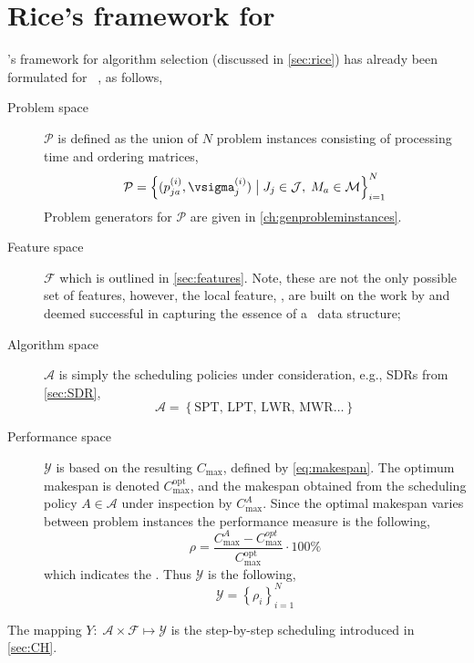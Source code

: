 \section{Rice's framework for \jsp}\label{sec:rice:jsp}
\citeauthor{Rice76}'s framework for algorithm selection (discussed in \cref{sec:rice}) has already been formulated for \jsp\ \citep[cf.][]{SmithMilesLion3,SmithMilesLion5,InRu12}, as follows, 
\begin{description} 
\item[Problem space] $\mathcal{P}$ is defined as the union of $N$ problem instances consisting of processing time and ordering matrices,
\begin{equation} 
\mathcal{P}=\left\{(p_{ja}^{(i)},\vsigma_j^{(i)})\;\big|\;J_j\in\mathcal{J},\;M_a\in\mathcal{M}\right\}_{i=1}^{N}
\end{equation}
Problem generators for $\mathcal{P}$ are given in \cref{ch:genprobleminstances}.
\item[Feature space] $\mathcal{F}$ which is outlined in \cref{sec:features}. Note, these are not the only possible set of features, however, the local feature, \phiLocalRelated, are built on the work by \cite{InRu11a,SmithMilesLion3} and deemed successful in capturing the essence of a \jsp\ data structure;
\item[Algorithm space] $\mathcal{A}$ is simply the scheduling policies under consideration, e.g., SDRs from \cref{sec:SDR},
\begin{equation}
\mathcal{A}=\left\{\text{SPT,~LPT,~LWR,~MWR}\dotsc\right\}
\end{equation} 
\item[Performance space] $\mathcal{Y}$ is based on the resulting $C_{\max}$, defined by \cref{eq:makespan}. The optimum makespan is denoted $C_{\max}^{\text{opt}}$, and the makespan obtained from the scheduling policy $A\in\mathcal{A}$ under inspection by $C_{\max}^{A}$. Since the optimal makespan varies between problem instances the performance measure is the following, 
\begin{equation}\label{eq:rho}
\rho=\frac{C_{\max}^{A}-C_{\max}^{opt}}{C_{\max}^{\text{opt}}}\cdot 100\%
\end{equation}
which indicates the \namerho. Thus $\mathcal{Y}$ is the following, 
\begin{equation}
\mathcal{Y}=\left\{\rho_i\right\}_{i=1}^{N}
\end{equation}
\end{description}
The mapping $Y:\;\mathcal{A}\times\mathcal{F} \mapsto \mathcal{Y}$ is the step-by-step scheduling introduced in \cref{sec:CH}.